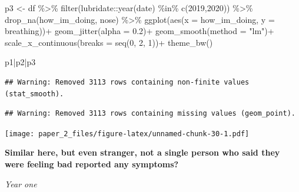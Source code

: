 \documentclass[
]{article}
\newenvironment{Shaded}{\begin{snugshade}}{\end{snugshade}}
\newcommand{\AttributeTok}[1]{\textcolor[rgb]{0.77,0.63,0.00}{#1}}
\newcommand{\DecValTok}[1]{\textcolor[rgb]{0.00,0.00,0.81}{#1}}
\newcommand{\FloatTok}[1]{\textcolor[rgb]{0.00,0.00,0.81}{#1}}
\newcommand{\FunctionTok}[1]{\textcolor[rgb]{0.00,0.00,0.00}{#1}}
\newcommand{\NormalTok}[1]{#1}
\newcommand{\OtherTok}[1]{\textcolor[rgb]{0.56,0.35,0.01}{#1}}
\newcommand{\SpecialCharTok}[1]{\textcolor[rgb]{0.00,0.00,0.00}{#1}}
\newcommand{\StringTok}[1]{\textcolor[rgb]{0.31,0.60,0.02}{#1}}
\begin{document}
\begin{Shaded}
\begin{Highlighting}[]
\NormalTok{p3 }\OtherTok{\textless{}{-}}\NormalTok{ df }\SpecialCharTok{\%\textgreater{}\%}
  \FunctionTok{filter}\NormalTok{(lubridate}\SpecialCharTok{::}\FunctionTok{year}\NormalTok{(date) }\SpecialCharTok{\%in\%} \FunctionTok{c}\NormalTok{(}\DecValTok{2019}\NormalTok{,}\DecValTok{2020}\NormalTok{)) }\SpecialCharTok{\%\textgreater{}\%}
  \FunctionTok{drop\_na}\NormalTok{(how\_im\_doing,}
\NormalTok{          nose) }\SpecialCharTok{\%\textgreater{}\%}
  \FunctionTok{ggplot}\NormalTok{(}\FunctionTok{aes}\NormalTok{(}\AttributeTok{x =}\NormalTok{ how\_im\_doing, }\AttributeTok{y =}\NormalTok{ breathing))}\SpecialCharTok{+}
  \FunctionTok{geom\_jitter}\NormalTok{(}\AttributeTok{alpha =} \FloatTok{0.2}\NormalTok{)}\SpecialCharTok{+}
  \FunctionTok{geom\_smooth}\NormalTok{(}\AttributeTok{method =} \StringTok{"lm"}\NormalTok{)}\SpecialCharTok{+}
  \FunctionTok{scale\_x\_continuous}\NormalTok{(}\AttributeTok{breaks =} \FunctionTok{seq}\NormalTok{(}\DecValTok{0}\NormalTok{, }\DecValTok{2}\NormalTok{, }\DecValTok{1}\NormalTok{))}\SpecialCharTok{+}
  \FunctionTok{theme\_bw}\NormalTok{()}

\NormalTok{p1}\SpecialCharTok{|}\NormalTok{p2}\SpecialCharTok{|}\NormalTok{p3}
\end{Highlighting}
\end{Shaded}

\begin{verbatim}
## Warning: Removed 3113 rows containing non-finite values (stat_smooth).
\end{verbatim}

\begin{verbatim}
## Warning: Removed 3113 rows containing missing values (geom_point).
\end{verbatim}

\texttt{[image: paper\_2\_files/figure-latex/unnamed-chunk-30-1.pdf]}

\textbf{Similar here, but even stranger, not a single person who said
they were feeling bad reported any symptoms?}

\emph{Year one}
\end{document}
